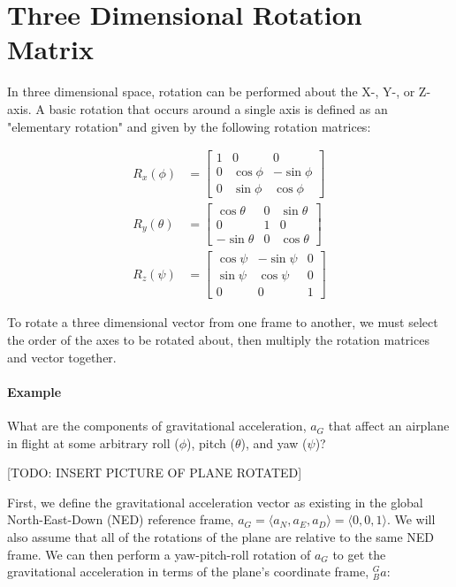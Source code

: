 \section{Three Dimensional Rotation Matrix} \label{sec:3d_rot_mat}
In three dimensional space, rotation can be performed about the X-, Y-, or Z-axis. A basic rotation that occurs around a single axis is defined as an "elementary rotation" and given by the following rotation matrices:

\begin{align*}
    R_x(\phi) &= \left[
        \begin{matrix}
            1 & 0 & 0 \\
            0 & \cos\phi & -\sin\phi \\
            0 & \sin\phi & \cos\phi
        \end{matrix}
    \right] \\
    R_y(\theta) &= \left[
        \begin{matrix}
            \cos\theta & 0 & \sin\theta \\
            0 & 1 & 0 \\
            -\sin\theta & 0 & \cos\theta
        \end{matrix}
    \right] \\
    R_z(\psi) &= \left[
        \begin{matrix}
            \cos\psi & -\sin\psi & 0 \\
            \sin\psi & \cos\psi & 0 \\
            0 & 0 & 1
        \end{matrix}
    \right]
\end{align*}

To rotate a three dimensional vector from one frame to another, we must select the order of the axes to be rotated about, then multiply the rotation matrices and vector together.
\paragraph*{Example} What are the components of gravitational acceleration, $a_G$ that affect an airplane in flight at some arbitrary roll ($\phi$), pitch ($\theta$), and yaw ($\psi$)?

[TODO: INSERT PICTURE OF PLANE ROTATED]

First, we define the gravitational acceleration vector as existing in the global North-East-Down (NED) reference frame, $a_G = \langle a_N, a_E, a_D \rangle = \langle 0, 0, 1 \rangle$.
We will also assume that all of the rotations of the plane are relative to the same NED frame.
We can then perform a yaw-pitch-roll rotation of $a_G$ to get the gravitational acceleration in terms of the plane's coordinate frame, ${}^G_B a$:

